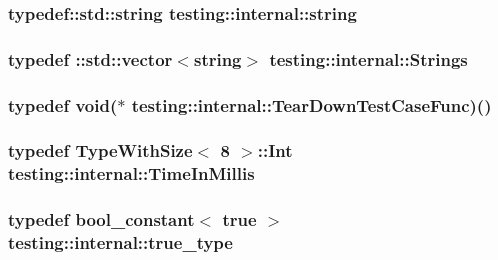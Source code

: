 \hypertarget{namespacetesting_1_1internal_a5ca8a348395a6145775c1a2334e21889}{
\subsubsection[{string}]{\setlength{\rightskip}{0pt plus 5cm}typedef\-::std\-::string {\bf testing\-::internal\-::string}}}\label{namespacetesting_1_1internal_a5ca8a348395a6145775c1a2334e21889}
\hypertarget{namespacetesting_1_1internal_a7706b17f05f4b49e351b052ae4e05073}{
\subsubsection[{Strings}]{\setlength{\rightskip}{0pt plus 5cm}typedef \-::std\-::vector$<${\bf string}$>$ {\bf testing\-::internal\-::\-Strings}}}\label{namespacetesting_1_1internal_a7706b17f05f4b49e351b052ae4e05073}
\hypertarget{namespacetesting_1_1internal_aad40244621b68546f3b830696225bf9b}{
\subsubsection[{Tear\-Down\-Test\-Case\-Func}]{\setlength{\rightskip}{0pt plus 5cm}typedef void($\ast$ testing\-::internal\-::\-Tear\-Down\-Test\-Case\-Func)()}}\label{namespacetesting_1_1internal_aad40244621b68546f3b830696225bf9b}
\hypertarget{namespacetesting_1_1internal_a5eed833eddf9ea8ca45546c125f4ef0c}{
\subsubsection[{Time\-In\-Millis}]{\setlength{\rightskip}{0pt plus 5cm}typedef {\bf Type\-With\-Size}$<$ 8 $>$\-::Int {\bf testing\-::internal\-::\-Time\-In\-Millis}}}\label{namespacetesting_1_1internal_a5eed833eddf9ea8ca45546c125f4ef0c}
\hypertarget{namespacetesting_1_1internal_a0189db17b0bd7e74f149d460ea9531a5}{
\subsubsection[{true\-\_\-type}]{\setlength{\rightskip}{0pt plus 5cm}typedef {\bf bool\-\_\-constant}$<$ true $>$ {\bf testing\-::internal\-::true\-\_\-type}}}\label{namespacetesting_1_1internal_a0189db17b0bd7e74f149d460ea9531a5}
